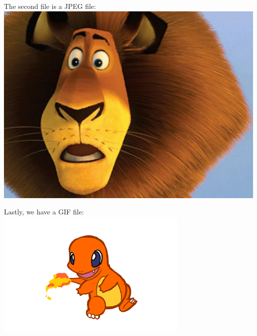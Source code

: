 \documentclass[12pt, titlepage]{article}
\begin{document}
The second file is a JPEG file: \\
\FloatBarrier
\includegraphics[scale=0.3]{lion}
\FloatBarrier


Lastly, we have a GIF file: \\
\FloatBarrier
\includegraphics[scale=0.5]{charmander}
\FloatBarrier
\end{document}
